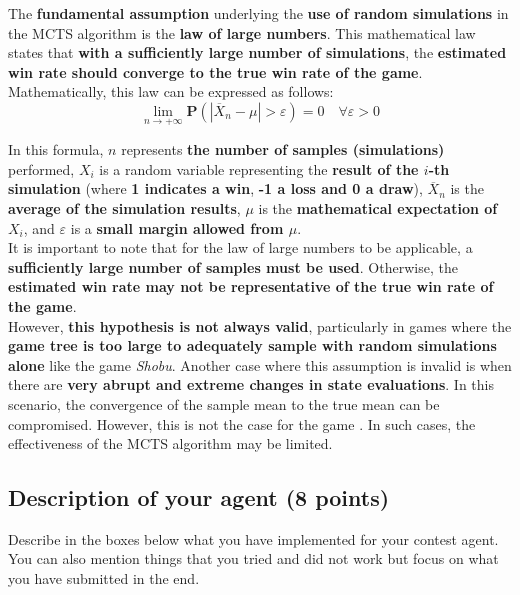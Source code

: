 \documentclass[11pt,a4paper]{report}
\begin{document}
\begin{answers}[15cm]
The \textbf{fundamental assumption} underlying the \textbf{use of random simulations} in the MCTS algorithm is the \textbf{law of large numbers}. This mathematical law states that \textbf{with a sufficiently large number of simulations}, the \textbf{estimated win rate should converge to the true win rate of the game}. \\

Mathematically, this law can be expressed as follows:
\[
\lim_{n \to +\infty} \mathbf{P} \left( \left| \overline{X}_n - \mu \right| > \varepsilon \right) = 0 \quad \forall \varepsilon > 0
\]

In this formula, \(n\) represents \textbf{the number of samples (simulations)} performed, \(X_i\) is a random variable representing the \textbf{result of the \(i\)-th simulation} (where \textbf{1 indicates a win}, \textbf{-1 a loss and 0 a draw}), \(\overline{X}_n\) is the \textbf{average of the simulation results}, \(\mu\) is the \textbf{mathematical expectation of \(X_i\)}, and \(\varepsilon\) is a \textbf{small margin allowed from \(\mu\)}. \\

It is important to note that for the law of large numbers to be applicable, a \textbf{sufficiently large number of samples must be used}. Otherwise, the \textbf{estimated win rate may not be representative of the true win rate of the game}. \\

However, \textbf{this hypothesis is not always valid}, particularly in games where the \textbf{game tree is too large to adequately sample with random simulations alone} like the game \textit{Shobu}. Another case where this assumption is invalid is when there are \textbf{very abrupt and extreme changes in state evaluations}. In this scenario, the convergence of the sample mean to the true mean can be compromised. However, this is not the case for the game . In such cases, the effectiveness of the MCTS algorithm may be limited.

\end{answers}


\newpage
\subsection{Description of your agent (8 points)}
Describe in the boxes below what you have implemented for your contest agent. You can also mention things that you tried and did not work but focus on what you have submitted in the end.
\end{document}

